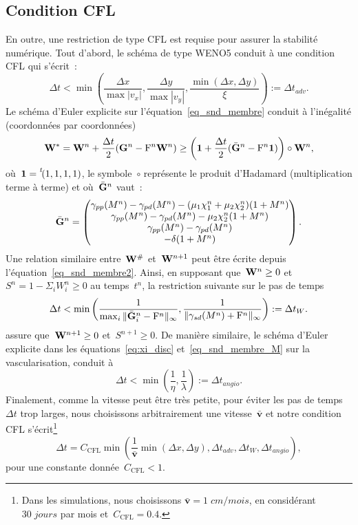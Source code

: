 \documentclass[11pt]{amsart}
\numberwithin{equation}{section}
\newcommand{\CFL}{{\mathrm{CFL}}}
\newcommand{\W}{{\bf W}}
\newcommand{\Frm}{{\rm F}}
\newcommand{\chiI}{\chi_1}
\newcommand{\chiS}{\chi_2}
\newcommand{\muI}{\mu_1}
\newcommand{\muS}{\mu_2}
\newcommand{\muN}{\delta}
\newcommand{\GG}{{\bf G}}
\newcommand{\trans}[1]{\prescript{\mathit{t\!}}{}{#1}}
\newcommand{\gammapp}{\gamma_{pp}}
\newcommand{\gammapd}{\gamma_{pd}}
\newcommand{\gammasd}{\gamma_{sd}}
\newcommand{\vit}{\mathbf{v}}
\begin{document}
\subsection{Condition CFL}

En outre, une restriction de type CFL est requise pour assurer la stabilité numérique. Tout d'abord, le schéma de type WENO5 conduit à une condition CFL qui s'écrit~:
\begin{equation}\label{eq:CFL-weno}
\Delta t < \min \left( \frac{\Delta x}{\max |v_x|} , \frac{\Delta y}{\max |v_y|}, \frac{\min(\Delta x , \Delta y )}{\xi}\right) := \Delta t_{adv}.
\end{equation}
Le schéma d'Euler explicite sur l'équation~\eqref{eq_snd_membre} conduit à l'inégalité 
(coordonnées par coordonnées)
$$
\W^{*}=\W^n+\frac{\Delta t}{2} (\GG^n -\Frm^n\W^n) \geq 
\left( \mathbf{1}+\frac{\Delta t}{2} (\bar{\GG}^n - \Frm^n\mathbf{1} )\right) \circ \W^n,
$$
où~$\mathbf{1}=\trans{(1,1,1,1)}$, le symbole~$\circ$ représente le produit d'Hadamard (multiplication terme à terme) et où~$\bar{\GG}^n$ vaut~:
$$
\bar{\GG}^n = \begin{pmatrix}
\gammapp(M^n)- \gammapd(M^n) - (\muI \chiI^n +\muS \chiS^n )(1+M^n) \\
\gammapp(M^n)- \gammapd(M^n) - \muS \chiS^n (1+M^n) \\
\gammapp(M^n) - \gammapd(M^n) \\
- \muN(1+M^n)
\end{pmatrix}.
$$
Une relation similaire entre~$\W^\#$ et~$\W^{n+1}$ 
peut être écrite depuis l'équation~\eqref{eq_snd_membre2}. 
Ainsi, en supposant que~$\W^n\geq 0$ et~$S^n=1-\Sigma_i W^n_i\geq 0$ 
au temps~$t^n$, la restriction suivante sur le pas de temps
\begin{equation}\label{eq:CFL-spliting-pop}
\Delta t < \min \left( \dfrac{1}{ \max_i \|  \bar{\GG}_i^n-\Frm^n \|_\infty} , \dfrac{1}{ \| \gammasd(M^n) + \Frm^n  \|_{\infty}} \right) := \Delta t_{W}.
\end{equation}
assure que~$\W^{n+1}\geq 0$ et~$S^{n+1}\geq 0$. 
De manière similaire, le schéma d'Euler explicite dans les équations~\eqref{eq:xi_disc} et~\eqref{eq_snd_membre_M} 
sur la vascularisation, conduit à
\begin{equation}\label{eq:CFL-spliting-vasc}
\Delta t < \min \left(  \frac{1}{\eta} , \frac{1}{\lambda}\right) := \Delta t_{angio}.
\end{equation}
Finalement, comme la vitesse peut être très petite, pour éviter les pas de temps 
$\Delta t$ trop larges, nous choisissons arbitrairement une vitesse~$\bar{\vit}$ et notre condition CFL s'écrit\footnote{Dans les simulations, nous choisissons 
$\bar{\vit}=1\;cm/mois$, en considérant~$30\;jours$ par mois et~$C_{\CFL}=0.4$.} 
\begin{equation}\label{eq:dt}
\Delta t =C_{\CFL}\min \left( \frac{1}{{\bar{\vit}}} \min( \Delta x, \Delta y) , \Delta t_{adv}, \Delta t_{W} , \Delta t_{angio} \right),
\end{equation}
pour une constante donnée~$C_{\CFL}<1$.
\end{document}
